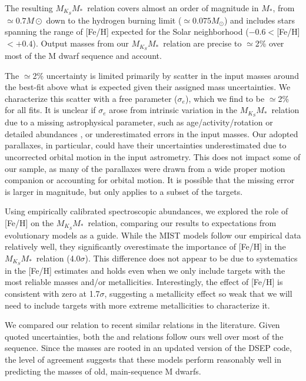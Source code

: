 \documentclass[twocolumn]{aastex62}
\newcommand{\mmk}{$M_{K_S}$\textendash$M_*$}
\begin{document}
The resulting \mmk\ relation covers almost an order of magnitude in $M_*$, from $\simeq0.7M\odot$ down to the hydrogen burning limit ($\simeq0.075M_\odot$) and includes stars spanning the range of [Fe/H] expected for the Solar neighborhood ($-0.6<$[Fe/H]$<+0.4$). Output masses from our \mmk\ relation are precise to $\simeq$2\% over most of the M dwarf sequence and account. 

The $\simeq$2\% uncertainty is limited primarily by scatter in the input masses around the best-fit above what is expected given their assigned mass uncertainties. We characterize this scatter with a free parameter ($\sigma_e$), which we find to be $\simeq$2\% for all fits. It is unclear if $\sigma_e$ arose from intrinsic variation in the \mmk\ relation due to a missing astrophysical parameter, such as age/activity/rotation \citep[e.g.,][]{Kraus2011,Feiden:2016aa,Somers2017} or detailed abundances \citep[e.g.,][]{2017A&A...604A..97L,Veyette2017}, or underestimated errors in the input masses. Our adopted parallaxes, in particular, could have their uncertainties underestimated due to uncorrected orbital motion in the input astrometry. This does not impact some of our sample, as many of the parallaxes were drawn from a wide proper motion companion or accounting for orbital motion. It is possible that the missing error is larger in magnitude, but only applies to a subset of the targets. 

Using empirically calibrated spectroscopic abundances, we explored the role of [Fe/H] on the \mmk\ relation, comparing our results to expectations from evolutionary models as a guide. While the MIST models follow our empirical data relatively well, they significantly overestimate the importance of [Fe/H] in the \mmk\ relation (4.0$\sigma$). This difference does not appear to be due to systematics in the [Fe/H] estimates and holds even when we only include targets with the most reliable masses and/or metallicities. Interestingly, the effect of [Fe/H] is consistent with zero at 1.7$\sigma$, suggesting a metallicity effect so weak that we will need to include targets with more extreme metallicities to characterize it. 

We compared our relation to recent similar relations in the literature. Given quoted uncertainties, both the \citet{Delfosse2000} and \citet{Mann2015b} relations follow ours well over most of the sequence. Since the \citet{Mann2015b} masses are rooted in an updated version of the DSEP code, the level of agreement suggests that these models perform reasonably well in predicting the masses of old, main-sequence M dwarfs. 
\end{document}
